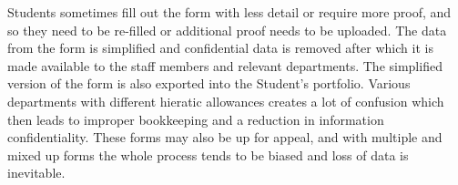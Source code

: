 \documentclass[../main.tex]{subfiles}
\begin{document}
\raggedright
Students sometimes fill out the form with less detail or require more proof, and so they need to be re-filled or additional proof needs to be uploaded. The data from the form is simplified and confidential data is removed after which it is made available to the staff members and relevant departments. The simplified version of the form is also exported into the Student's portfolio. Various departments with different hieratic allowances creates a lot of confusion which then leads to improper bookkeeping and a reduction in information confidentiality. These forms may also be up for appeal, and with multiple and mixed up forms the whole process tends to be biased and loss of data is inevitable. 
\end{document}
